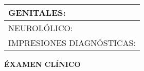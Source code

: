 \documentclass[10pt,a4paper]{article}
\begin{document}
{\begin{tabular}{|p{5.5cm} p{5.5cm} |}
\hline
\multicolumn{2}{|l|}{\begin{minipage}[t]{12.5 cm}\scriptsize{GENITALES: }\end{minipage}}\\
\hline
\multicolumn{2}{|l|}{\begin{minipage}[t]{12.5 cm}\scriptsize{NEUROL\'OLICO: }\end{minipage}}\\
\hline
\multicolumn{2}{|l|}{\begin{minipage}[t]{12.5 cm}\scriptsize{IMPRESIONES DIAGN\'OSTICAS: }\end{minipage}}\\
\hline
\end{tabular}}
\vspace{0.6cm}
\begin{flushleft}
\begin{LARGE}
\textbf{\'EXAMEN CL\'INICO}
\end{LARGE}
\end{flushleft}
\end{document}
